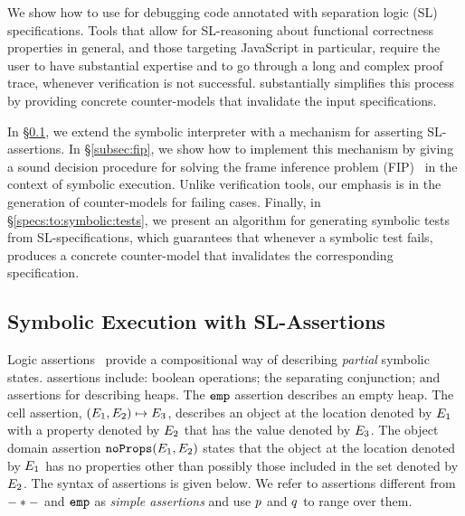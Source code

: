 
We show how to use \cosette for debugging \jsil code annotated with 
separation logic (SL) specifications. Tools that allow for SL-reasoning about
functional correctness properties in general, and those targeting 
JavaScript in particular, require the user to have substantial expertise 
and to go through a long and complex proof trace, whenever verification
is not successful. \cosette substantially simplifies this process by providing
concrete counter-models that invalidate the input specifications.

In \S\ref{subsec:sep:assertions}, we extend the 
 \jsil symbolic interpreter with a mechanism for asserting
SL-assertions. 
%
In \S\ref{subsec:fip}, we show how to implement this mechanism by giving 
a sound decision procedure for solving the frame inference problem (FIP)~\cite{}
in the context of symbolic execution.
%
Unlike verification tools, our emphasis is in the generation of counter-models 
for failing cases. 
%
Finally, in \S\ref{specs:to:symbolic:tests}, we present an algorithm  
for generating symbolic tests from SL-specifications, which guarantees 
that whenever a symbolic test fails, \cosette produces a concrete 
counter-model that invalidates the corresponding specification.

\vspace{-5pt}
\subsection{Symbolic Execution with SL-Assertions}\label{subsec:sep:assertions}

\jsil Logic assertions~\cite{javert}
provide a compositional way of describing \emph{partial} symbolic states. 
\jsil assertions include: boolean operations; the separating conjunction; 
and assertions for describing heaps. The $\texttt{emp}$ assertion describes 
an empty heap. The cell assertion, $(E_1,E_2) \mapsto E_3$,  describes an object 
at the location denoted by $E_1$ with a property denoted by $E_2$ that has the value 
denoted by $E_3$. The object domain assertion $\texttt{noProps}(E_1, E_2)$ states that the object at 
the location denoted by $E_1$ has no properties other than possibly those included in the
set denoted by $E_2$. The syntax of assertions is given below. 
We refer to assertions different from $- \mathbin{*} -$ and $\texttt{emp}$ as \emph{simple assertions}
and use $p$ and $q$ to range over them.

